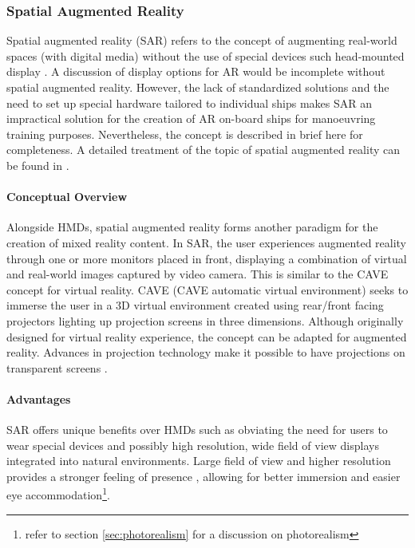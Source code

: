 \subsubsection{Spatial Augmented Reality}

Spatial augmented reality (SAR) refers to the concept of augmenting real-world spaces (with digital media) without the use of special devices such head-mounted display \parencite{bimber2005spatial}. A discussion of display options for AR would be incomplete without spatial augmented reality. However, the lack of standardized solutions and the need to set up special hardware tailored to individual ships makes SAR an impractical solution for the creation of AR on-board ships for manoeuvring training purposes. Nevertheless, the concept is described in brief here for completeness. A detailed treatment of the topic of spatial augmented reality can be found in \cite{bimber2005spatial}.

\paragraph{Conceptual Overview}
Alongside HMDs, spatial augmented reality forms another paradigm for the creation of mixed reality content. In SAR, the user experiences augmented reality through one or more monitors placed in front, displaying a combination of virtual and real-world images captured by video camera. This is similar to the CAVE \parencite{cruz1993surround} concept for virtual reality. CAVE (CAVE automatic virtual environment) seeks to immerse the user in a 3D virtual environment created using rear/front facing projectors lighting up projection screens in three dimensions. Although originally designed for virtual reality experience, the concept can be adapted for augmented reality. Advances in projection technology make it possible to have projections on transparent screens \parencite{peterson2006human}. 

\paragraph{Advantages}
SAR offers unique benefits over HMDs such as obviating the need for users to wear special devices and possibly high resolution, wide field of view displays integrated into natural environments. Large field of view and higher resolution provides a stronger feeling of presence \parencite{lantz1996future}, allowing for better immersion and easier eye accommodation\footnote{refer to section \ref{sec:photorealism} for a discussion on photorealism}. 

